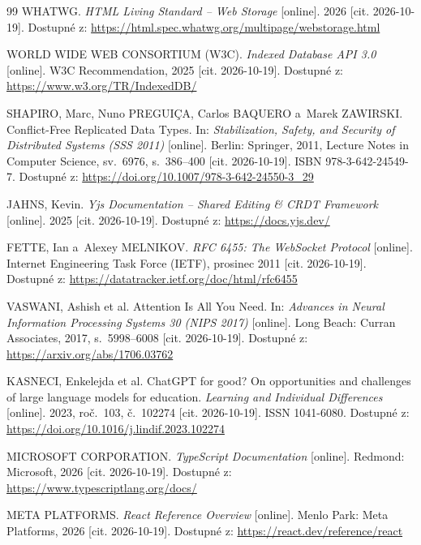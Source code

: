 \documentclass[12pt, a4paper, oneside]{article}
\begin{document}
\begin{thebibliography}{99}
    WHATWG. \textit{HTML Living Standard -- Web Storage} [online]. 2026 [cit. 2026-10-19]. Dostupné z: \url{https://html.spec.whatwg.org/multipage/webstorage.html}

    WORLD WIDE WEB CONSORTIUM (W3C). \textit{Indexed Database API 3.0} [online]. W3C Recommendation, 2025 [cit. 2026-10-19]. Dostupné z: \url{https://www.w3.org/TR/IndexedDB/}

    SHAPIRO, Marc, Nuno PREGUIÇA, Carlos BAQUERO a~Marek ZAWIRSKI. Conflict-Free Replicated Data Types. In: \textit{Stabilization, Safety, and Security of Distributed Systems (SSS 2011)} [online]. Berlin: Springer, 2011, Lecture Notes in Computer Science, sv.~6976, s.~386--400 [cit. 2026-10-19]. ISBN 978-3-642-24549-7. Dostupné z: \url{https://doi.org/10.1007/978-3-642-24550-3_29}

    JAHNS, Kevin. \textit{Yjs Documentation -- Shared Editing \& CRDT Framework} [online]. 2025 [cit. 2026-10-19]. Dostupné z: \url{https://docs.yjs.dev/}

    FETTE, Ian a~Alexey MELNIKOV. \textit{RFC 6455: The WebSocket Protocol} [online]. Internet Engineering Task Force (IETF), prosinec 2011 [cit. 2026-10-19]. Dostupné z: \url{https://datatracker.ietf.org/doc/html/rfc6455}

    VASWANI, Ashish et al. Attention Is All You Need. In: \textit{Advances in Neural Information Processing Systems 30 (NIPS 2017)} [online]. Long Beach: Curran Associates, 2017, s.~5998--6008 [cit. 2026-10-19]. Dostupné z: \url{https://arxiv.org/abs/1706.03762}

    KASNECI, Enkelejda et al. ChatGPT for good? On opportunities and challenges of large language models for education. \textit{Learning and Individual Differences} [online]. 2023, roč.~103, č.~102274 [cit. 2026-10-19]. ISSN 1041-6080. Dostupné z: \url{https://doi.org/10.1016/j.lindif.2023.102274}

    MICROSOFT CORPORATION. \textit{TypeScript Documentation} [online]. Redmond: Microsoft, 2026 [cit. 2026-10-19]. Dostupné z: \url{https://www.typescriptlang.org/docs/}

    META PLATFORMS. \textit{React Reference Overview} [online]. Menlo Park: Meta Platforms, 2026 [cit. 2026-10-19]. Dostupné z: \url{https://react.dev/reference/react}


\end{thebibliography}
\end{document}
